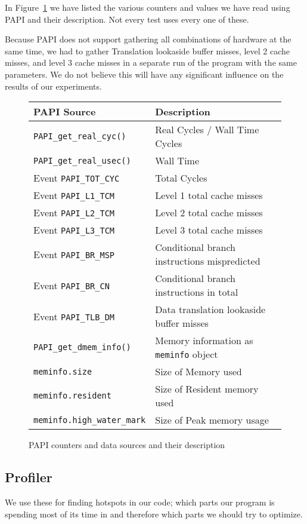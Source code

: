 In Figure~\ref{papievents} we have listed the various counters and values we have read using PAPI and their description. Not every test uses every one of these.

Because PAPI does not support gathering all combinations of hardware at the same time, we had to gather Translation lookaside buffer misses, level 2 cache misses, and level 3 cache misses in a separate run of the program with the same parameters.
We do not believe this will have any significant influence on the results of our experiments.

\begin{figure}
\caption{PAPI counters and data sources and their description}
\label{papievents}
\center
\begin{tabular}{|l|l|}
\hline
\textbf{PAPI Source}	& \textbf{Description} \\ \hline
\texttt{PAPI\_get\_real\_cyc()}	& Real Cycles / Wall Time Cycles \\ \hline
\texttt{PAPI\_get\_real\_usec()}	& Wall Time \\ \hline
Event \texttt{PAPI\_TOT\_CYC}	& Total Cycles \\ \hline
Event \texttt{PAPI\_L1\_TCM}		& Level 1 total cache misses \\ \hline
Event \texttt{PAPI\_L2\_TCM}		& Level 2 total cache misses \\ \hline
Event \texttt{PAPI\_L3\_TCM}		& Level 3 total cache misses \\ \hline
Event \texttt{PAPI\_BR\_MSP}		& Conditional branch instructions mispredicted \\ \hline
Event \texttt{PAPI\_BR\_CN}		& Conditional branch instructions in total \\ \hline
Event \texttt{PAPI\_TLB\_DM}		& Data translation lookaside buffer misses \\ \hline
\texttt{PAPI\_get\_dmem\_info()}	& Memory information as \texttt{meminfo} object \\ \hline
\texttt{meminfo.size}			& Size of Memory used \\ \hline
\texttt{meminfo.resident}		& Size of Resident memory used \\ \hline
\texttt{meminfo.high\_water\_mark}	& Size of Peak memory usage \\ \hline



\end{tabular}
\end{figure}

\subsection{Profiler}
We use these for finding hotspots in our code; which parts our program is spending most of its time in and therefore which parts we should try to optimize.

